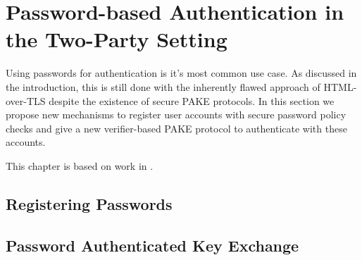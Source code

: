 \chapter{Password-based Authentication in the Two-Party Setting}
Using passwords for authentication is it's most common use case.
As discussed in the introduction, this is still done with the inherently flawed approach of \ac{HTML}-over-\ac{TLS} despite the existence of secure \ac{PAKE} protocols.
In this section we propose new mechanisms to register user accounts with secure password policy checks and give a new verifier-based \ac{PAKE} protocol to authenticate with these accounts.

This chapter is based on work in \cite{KieferM14b,KieferM15a,DongK15a,ManulisSKD15a}.

\section{Registering Passwords}



\section{Password Authenticated Key Exchange}
